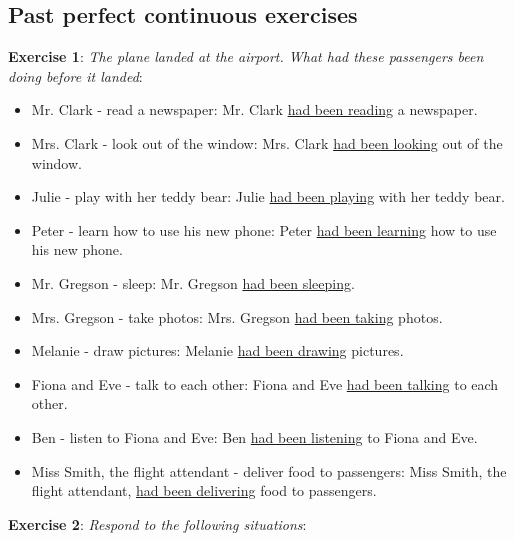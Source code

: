 \subsection{Past perfect continuous exercises}

\textbf{Exercise 1}: \textit{The plane landed at the airport. What had these passengers been doing before it landed}: 

\begin{itemize}

\item Mr. Clark - read a newspaper: Mr. Clark \underline{had been reading} a newspaper.
\item Mrs. Clark - look out of the window: Mrs. Clark \underline{had been looking} out of the window.
\item Julie - play with her teddy bear: Julie \underline{had been playing} with her teddy bear.
\item Peter - learn how to use his new phone: Peter \underline{had been learning} how to use his new phone.
\item Mr. Gregson - sleep: Mr. Gregson \underline{had been sleeping}.
\item Mrs. Gregson - take photos: Mrs. Gregson \underline{had been taking} photos.
\item Melanie - draw pictures: Melanie \underline{had been drawing} pictures.
\item Fiona and Eve - talk to each other: Fiona and Eve \underline{had been talking} to each other.
\item Ben - listen to Fiona and Eve: Ben \underline{had been listening} to Fiona and Eve.
\item Miss Smith, the flight attendant - deliver food to passengers: Miss Smith, the flight attendant, \underline{had been delivering} food to passengers.

\end{itemize}

\textbf{Exercise 2}: \textit{Respond to the following situations}:

